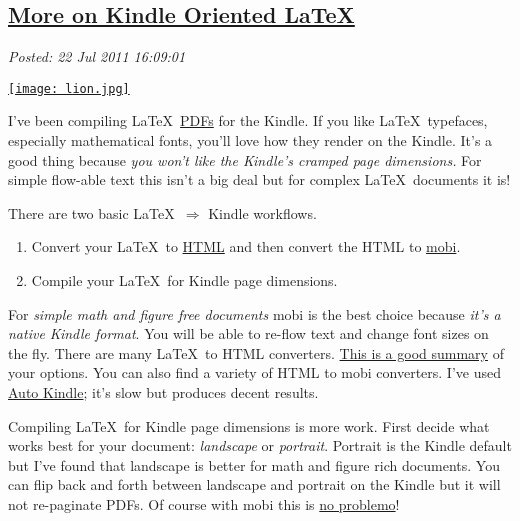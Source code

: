 %

\subsection*{\href{http://bakerjd99.wordpress.com/2011/07/22/more-on-kindle-oriented-latex/}{More on Kindle Oriented \LaTeX}}


\noindent\emph{Posted: 22 Jul 2011 16:09:01}
\vspace{6pt}

\captionsetup[floatingfigure]{labelformat=empty}
\begin{floatingfigure}[l]{0.20\textwidth}
\centering
\href{http://www.personal.psu.edu/ixc128/latex.html}{\texttt{[image: lion.jpg]}}
\label{fig:1543X0}
\end{floatingfigure}I've been compiling \LaTeX\
\href{http://www.fileinfo.com/extension/pdf}{PDFs} for the Kindle. If
you like \LaTeX\ typefaces, especially mathematical fonts, you'll
love how they render on the Kindle. It's a good thing because \emph{you
won't like the Kindle's cramped page dimensions.} For simple flow-able
text this isn't a big deal but for complex \LaTeX\ documents it
is!

There are two basic \LaTeX\ $\Longrightarrow$ Kindle workflows.

\begin{enumerate}
\item
  Convert your \LaTeX\ to
  \href{http://www.fileinfo.com/extension/html}{HTML} and then convert
  the HTML to
  \href{http://pcsupport.about.com/od/fileextensions/f/mobifile.htm}{mobi}.
\item
  Compile your \LaTeX\ for Kindle page dimensions.
\end{enumerate}
For \emph{simple math and figure free documents} mobi is the best choice
because \emph{it's a native Kindle format}. You will be able to re-flow
text and change font sizes on the fly. There are many \LaTeX\ to
HTML converters. \href{http://enc.com.au/docs/latexhtml/}{This is a good
summary} of your options. You can also find a variety of HTML to mobi
converters. I've used
\href{http://sourceforge.net/projects/autokindle/}{Auto Kindle}; it's
slow but produces decent results.

Compiling \LaTeX\ for Kindle page dimensions is more work. First
decide what works best for your document: \emph{landscape} or
\emph{portrait}. Portrait is the Kindle default but I've found that
landscape is better for math and figure rich documents. You can flip
back and forth between landscape and portrait on the Kindle but it will
not re-paginate PDFs. Of course with mobi this is
\href{http://www.youtube.com/watch?v=4QWfrxYt9DQ\&NR=1}{no problemo}!

